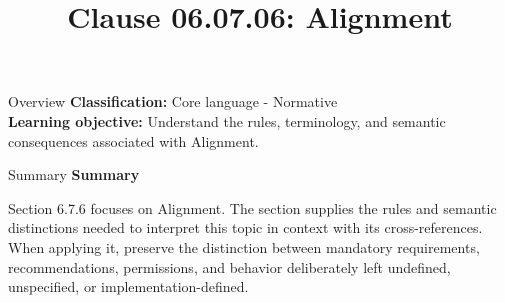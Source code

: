 \documentclass[10pt,letterpaper]{article}
\title{Clause 06.07.06: Alignment}
\author{}
\date{}
\begin{document}
\maketitle
\begin{CornellOverviewBox}{Overview}
\textbf{Classification:} Core language - Normative\\[2pt]
\textbf{Learning objective:} Understand the rules, terminology, and semantic consequences associated with Alignment.
\end{CornellOverviewBox}\begin{CornellSummaryBox}{Summary}
{\sffamily\bfseries\color{Accent} Summary}\par\vspace{3pt}Section 6.7.6 focuses on Alignment. The section supplies the rules and semantic distinctions needed to interpret this topic in context with its cross-references. When applying it, preserve the distinction between mandatory requirements, recommendations, permissions, and behavior deliberately left undefined, unspecified, or implementation-defined.
\end{CornellSummaryBox}
\end{document}
